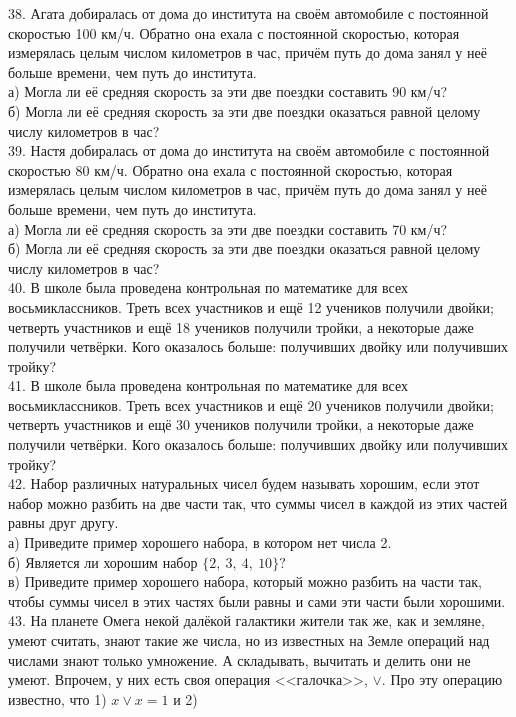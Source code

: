 \documentclass[12pt]{article}
\begin{document}
38. Агата добиралась от дома до института на своём автомобиле с постоянной скоростью 100 км/ч. Обратно она ехала с постоянной скоростью, которая измерялась целым числом километров в час, причём путь до дома занял у неё больше времени, чем путь до института.\\
а) Могла ли её средняя скорость за эти две поездки составить 90 км/ч?\\
б) Могла ли её средняя скорость за эти две поездки оказаться равной целому числу километров в час?\\
39. Настя добиралась от дома до института на своём автомобиле с постоянной скоростью 80 км/ч. Обратно она ехала с постоянной скоростью, которая измерялась целым числом километров в час, причём путь до дома занял у неё больше времени, чем путь до института.\\
а) Могла ли её средняя скорость за эти две поездки составить 70 км/ч?\\
б) Могла ли её средняя скорость за эти две поездки оказаться равной целому числу километров в час?\\
40. В школе была проведена контрольная по математике для всех восьмиклассников. Треть всех участников и ещё 12 учеников получили двойки; четверть участников и ещё 18 учеников получили тройки, а некоторые даже получили четвёрки. Кого оказалось больше: получивших двойку или получивших тройку?\\
41. В школе была проведена контрольная по математике для всех восьмиклассников. Треть всех участников и ещё 20 учеников получили двойки; четверть участников и ещё 30 учеников получили тройки, а некоторые даже получили четвёрки. Кого оказалось больше: получивших двойку или получивших тройку?\\
42. Набор различных натуральных чисел будем называть хорошим, если этот набор можно разбить на две части так, что суммы чисел в каждой из этих частей равны друг другу.\\
а) Приведите пример хорошего набора, в котором нет числа 2.\\
б) Является ли хорошим набор $\{2,\ 3,\ 4,\ 10\}?$\\
в) Приведите пример хорошего набора, который можно разбить на части так, чтобы суммы чисел в этих частях были равны и сами эти части были хорошими.\\
43. На планете Омега некой далёкой галактики жители так же, как и земляне, умеют считать, знают такие же числа, но из известных на Земле операций над числами знают только умножение. А складывать, вычитать и делить они не умеют. Впрочем, у них есть своя операция <<галочка>>, $\vee.$ Про эту операцию известно, что 1) $x\vee x=1$ и 2)
\end{document}

